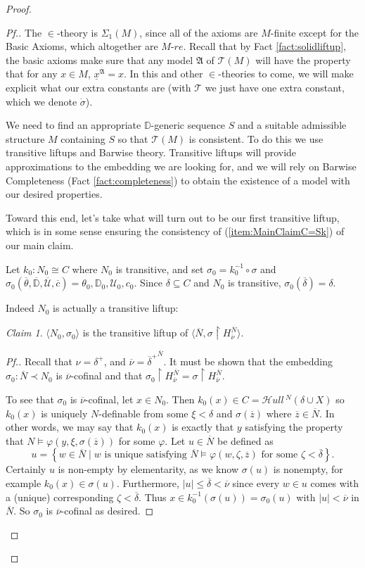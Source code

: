 \documentclass{amsart}
\theoremstyle{definition}
\theoremstyle{remark}
\newtheorem{claimno}{Claim}
\newcommand{\D}{\mathbb{D}}
\newcommand{\N}{{\overline{N}}}
\newcommand{\U}{\mathcal{U}}
\newcommand{\st}{\; | \;}
\newcommand{\set}[2]{\left\{#1\st #2 \right\}}
\newcommand{\SH}{\mathcal{H}\textit{ull} \,}
\newcommand{\Sk}[3]{\SH^{#1}( {#2} \cup {#3} ) }
\begin{document}
\begin{proof}
\begin{proof}[Pf.]
The $\in$-theory is $\Sigma_1(M)$, since all of the axioms are $M$-finite except for the \textsf{Basic Axioms}, which altogether are $M$-$re$. Recall that by Fact \ref{fact:solidliftup}, the basic axioms make sure that any model $\mathfrak A$ of $\mathcal T(M)$ will have the property that for any $x \in M$, $\underline x^{\mathfrak A}=x$. In this and other $\in$-theories to come, we will make explicit what our extra constants are (with $\mathcal T$ we just have one extra constant, which we denote $\dot \sigma$).

We need to find an appropriate $\D$-generic sequence $S$ and a suitable admissible structure $M$ containing $S$ so that $\mathcal T(M)$ is consistent. To do this we use transitive liftups and Barwise theory. Transitive liftups will provide approximations to the embedding we are looking for, and we will rely on Barwise Completeness (Fact \ref{fact:completeness}) to obtain the existence of a model with our desired properties. 

Toward this end, let's take what will turn out to be our first transitive liftup, which is in some sense ensuring the consistency of (\ref{item:MainClaimC=Sk}) of our main claim.

Let $k_0 : N_0 \cong C$ where $N_0$ is transitive, and set $\sigma_0 = k_0^{-1} \circ \sigma$ and $\sigma_0(\overline \theta, \overline{\D}, \overline{\U}, \overline c) = \theta_0, \D_0, \U_0, c_0.$
Since $\delta \subseteq C$ and $N_0$ is transitive, $\sigma_0(\overline \delta)=\delta$. 

Indeed $N_0$ is actually a transitive liftup:

\begin{claimno} \label{claim:N0isliftupofN} $\langle N_0, \sigma_0 \rangle$ is the transitive liftup of $\langle \N, \sigma \upharpoonright H_{\overline \nu}^{\N} \rangle$. \end{claimno}
\begin{proof}[Pf.] Recall that $\nu=\delta^+$, and $\overline \nu={\overline \delta^+}^{\N}$. It must be shown that the embedding $\sigma_0: \overline N \prec N_0$ is $\overline \nu$-cofinal and that $\sigma_0 \upharpoonright H_{\overline \nu}^{\N}=\sigma \upharpoonright H_{\overline \nu}^{\overline N}$. 

To see that $\sigma_0$ is $\overline \nu$-cofinal, let $x \in N_0$. Then $k_0(x) \in C = \Sk{N}{\delta}{X}$ so $k_0(x)$ is uniquely $N$-definable from some $\xi < \delta$ and $\sigma(\overline z)$ where $\overline z \in \N$. In other words, we may say that $k_0(x)$ is exactly that  $y$ satisfying the property that $N \models \varphi(y, \xi, \sigma(\overline z))$ for some $\varphi$. Let $u \in \N$ be defined as 
	$$u=\set{ w \in \N }{\text{$w$ is unique satisfying $\N \models \varphi(w, \zeta, \overline z)$ for some $\zeta < \overline \delta$}}.$$
Certainly $u$ is non-empty by elementarity, as we know $\sigma(u)$ is nonempty, for example $k_0(x) \in \sigma(u)$.
Furthermore, $|u| \leq \overline \delta < \overline \nu$ since every $w \in u$ comes with a (unique) corresponding $\zeta<\overline \delta$.
Thus $x \in k_0^{-1}(\sigma(u))=\sigma_0(u)$ with $|u| < \overline \nu$ in $\N$. So $\sigma_0$ is $\overline \nu$-cofinal as desired. 


\end{proof}
\end{proof}
\end{proof}
\end{document}
